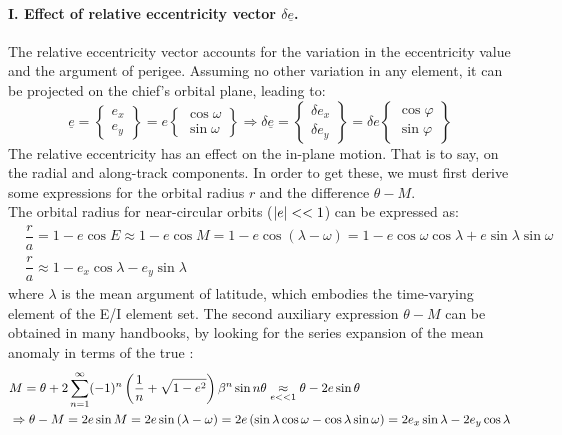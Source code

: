 			\paragraph{I. Effect of relative eccentricity vector $\delta \underline{e}$. \\}
			\indent The relative eccentricity vector accounts for the variation in the eccentricity value and the argument of perigee. Assuming no other variation in any element, it can be projected on the chief's orbital plane, leading to:
			\[
			\underline{e} = \left\{ 
			\begin{array}{c}
			 e_x \\[1.5em]
			 e_y
			\end{array}\right\} 
			 = e \left\{\begin{array}{c}
			 \cos\omega \\[1.5em]
			 \sin\omega 
			\end{array}\right\} 
			\Rightarrow
			\delta \underline{e} = 
			\left\{ 
			\begin{array}{c}
			\delta e_x \\[1.5em]
			\delta e_y
			\end{array}
			\right\} = \delta e
			\left\{ 
			\begin{array}{c}
			\cos\varphi \\[1.5em]
			\sin\varphi
			\end{array}
			\right\}
			\]
			\indent The relative eccentricity has an effect on the in-plane motion. That is to say, on the radial and along-track components. In order to get these, we must first derive some expressions for the orbital radius $r$ and the difference $\theta - M$. \\
			\indent The orbital radius for near-circular orbits ($\mbox{$\left\lvert e \right\rvert$}<<1$) can be expressed as:
			\begin{align}
			&\nonumber \dfrac{r}{a} = 1 -e\cos E \approx 1 - e\cos M = 1 - e\cos\left(\lambda - \omega\right) = 1 - e\cos\omega \cos \lambda+ e \sin \lambda \sin\omega \\
			& \dfrac{r}{a} \approx 1 - e_x \cos\lambda - e_y \sin \lambda
			\label{eqCh2:orbital_radius}
			\end{align}
			\noindent where $\lambda$ is the mean argument of latitude, which embodies the time-varying element of the E/I element set. The second auxiliary expression $\theta - M$ can be obtained in many handbooks, by looking for the series expansion of the mean anomaly in terms of the true \cite{Battin}:
			\begin{align}
			&\nonumber M =\theta+ 2\displaystyle\sum_{n=1}^{\infty} (-1)^{n} \left( \dfrac{1}{n} + \sqrt{1 - e^2} \right) \beta^n \sin n\theta \underset{e<<1}{\approx} \theta - 2 e \sin\theta\\
			& \Rightarrow \theta - M = 2 e\sin M = 2 e \sin\left(\lambda - \omega\right) = 2e\left(\sin\lambda\cos\omega - \cos\lambda\sin\omega\right) = 2 e_x\sin\lambda - 2 e_y \cos\lambda
			\label{eqCh2:M_expansion}
			\end{align}
